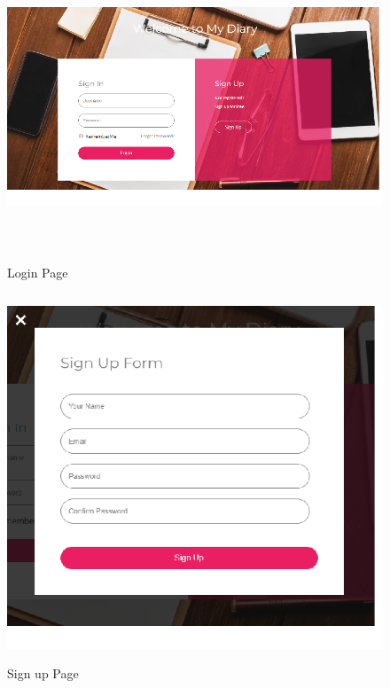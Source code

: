 \documentclass[a4paper]{article}
\begin{document}
\begin{enumerate}
	\begin{figure}[!h]
	 			\centering
      			\includegraphics[height=260pt,width=380pt]{Images/h11.png}
	 		 	\caption{Login Page}
	 		 	\label{mainbook11}
	  		\end{figure}


	\begin{figure}[!h]
	 			\centering
      			\includegraphics[height=310pt,width=340pt]{Images/h12.png}
	 		 	\caption{Sign up Page}
	 		 	\label{mainbook12}
	  		\end{figure}




\end{enumerate}
\end{document}
